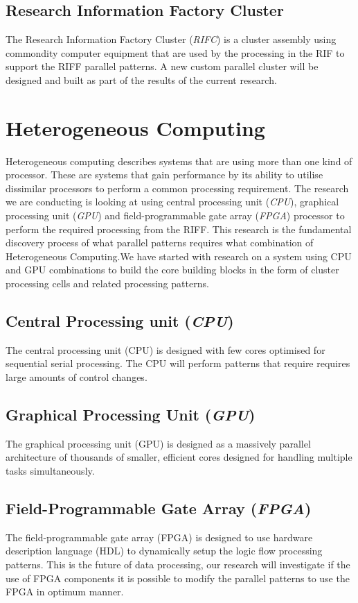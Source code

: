 \documentclass{acm_proc_article-sp}
\begin{document}
\subsection{Research Information Factory Cluster}
The Research Information Factory Cluster (\textit{RIFC}) is a cluster assembly using commondity computer equipment that are used by the processing in the RIF to support the RIFF parallel patterns. A new custom parallel cluster will be designed and built as part of the results of the current research.
\section{Heterogeneous Computing}
Heterogeneous computing describes systems that are using more than one kind of processor. These are systems that gain performance by its ability to utilise dissimilar processors to perform a common processing requirement. The research we are conducting is looking at using central processing unit (\textit{CPU}), graphical processing unit (\textit{GPU}) and field-programmable gate array (\textit{FPGA}) processor to perform the required processing from the RIFF. This research is the fundamental discovery process of what parallel patterns requires what combination of Heterogeneous Computing.We have started with research on a system using CPU and GPU combinations to build the core building blocks in the form of cluster processing cells and related processing patterns.
\subsection{Central Processing unit (\textit{CPU})}
The central processing unit (CPU) is designed with few cores optimised for sequential serial processing. The CPU will perform patterns that require requires large amounts of control changes.
\subsection{Graphical Processing Unit (\textit{GPU})}
The graphical processing unit (GPU) is designed as a massively parallel architecture of thousands of smaller, efficient cores designed for handling multiple tasks simultaneously.
\subsection{Field-Programmable Gate Array (\textit{FPGA})}
The field-programmable gate array (FPGA) is designed to use hardware description language (HDL) to dynamically setup the logic flow processing patterns. This is the future of data processing, our research will investigate if the use of FPGA components it is possible to modify the parallel patterns to use the FPGA in optimum manner.  
\end{document}
